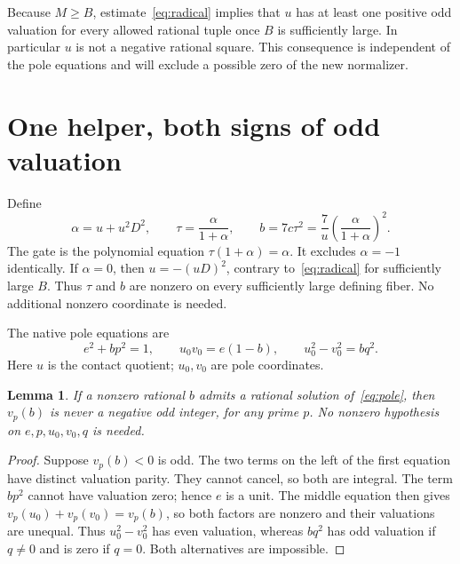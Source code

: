 \documentclass[11pt,a4paper]{article}
\newtheorem{lemma}[theorem]{Lemma}
\begin{document}
Because $M\ge B$, estimate~\eqref{eq:radical} implies that $u$ has
at least one positive odd valuation for every allowed rational tuple once
$B$ is sufficiently large. In particular $u$ is not a negative rational
square. This consequence is independent of the pole equations and will
exclude a possible zero of the new normalizer.

\section{One helper, both signs of odd valuation}

Define
\begin{equation}\label{eq:normalizer}
 \alpha=u+u^2D^2,\qquad
 \tau=\frac{\alpha}{1+\alpha},\qquad
 b=7c\tau^2=\frac7u\left(\frac{\alpha}{1+\alpha}\right)^2.
\end{equation}
The gate is the polynomial equation $\tau(1+\alpha)=\alpha$.
It excludes $\alpha=-1$ identically. If $\alpha=0$, then
$u=-(uD)^2$, contrary to~\eqref{eq:radical} for sufficiently large $B$.
Thus $\tau$ and $b$ are nonzero on every sufficiently large defining fiber.
No additional nonzero coordinate is needed.

The native pole equations are
\begin{equation}\label{eq:pole}
 e^2+bp^2=1,\qquad u_0v_0=e(1-b),\qquad u_0^2-v_0^2=bq^2.
\end{equation}
Here $u$ is the contact quotient; $u_0,v_0$ are pole coordinates.

\begin{lemma}\label{lem:pole-obstruction}
If a nonzero rational $b$ admits a rational solution of~\eqref{eq:pole},
then $v_p(b)$ is never a negative odd integer, for any prime $p$.
No nonzero hypothesis on $e,p,u_0,v_0,q$ is needed.
\end{lemma}
\begin{proof}
Suppose $v_p(b)<0$ is odd. The two terms on the left of the first
equation have distinct valuation parity. They cannot cancel, so both
are integral. The term $bp^2$ cannot have valuation zero; hence $e$
is a unit. The middle equation then gives
$v_p(u_0)+v_p(v_0)=v_p(b)$, so both factors are nonzero and their
valuations are unequal. Thus $u_0^2-v_0^2$ has even valuation, whereas
$bq^2$ has odd valuation if $q\ne0$ and is zero if $q=0$.
Both alternatives are impossible.
\end{proof}
\end{document}
